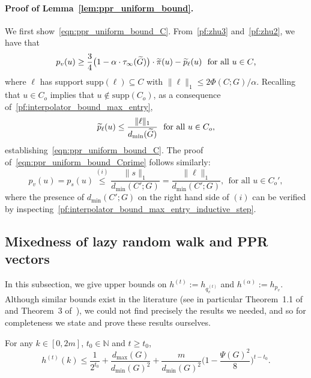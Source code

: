 \paragraph{Proof of Lemma~\ref{lem:ppr_uniform_bound}.}
	We first show~\eqref{eqn:ppr_uniform_bound_C}. From~\eqref{pf:zhu3} and~\eqref{pf:zhu2}, we have that
	\begin{equation*}
	p_v(u) \geq \frac{3}{4}\bigl(1 - \alpha \cdot \tau_{\infty}(\widetilde{G})\bigr) \cdot \widetilde{\pi}(u) - \widetilde{p}_{\ell}(u)~~\textrm{for all $u \in C$,}
	\end{equation*}
	where $\ell$ has support $\mathrm{supp}(\ell) \subseteq C$ with $\|\ell\|_1 \leq 2\Phi(C;G)/\alpha$. Recalling that $u \in C_{o}$ implies that $u \not\in \mathrm{supp}(C_{o})$, as a consequence of~\eqref{pf:interpolator_bound_max_entry}, 
	\begin{equation*}
	\widetilde{p}_{\ell}(u) \leq \frac{\|\ell\|_1}{d_{\min}(\widetilde{G})}~~\textrm{for all $u \in C_{o}$,}
	\end{equation*}
	establishing~\eqref{eqn:ppr_uniform_bound_C}. The proof of~\eqref{eqn:ppr_uniform_bound_Cprime} follows similarly:
	\begin{equation*}
	p_v(u) = p_s(u) \overset{(i)}{\leq} \frac{\|s\|_1}{d_{\min}(C';G)} = \frac{\|\ell\|_1}{d_{\min}(C';G)},~~\textrm{for all $u \in C_{o}'$},
	\end{equation*}
	where the presence of $d_{\min}(C';G)$ on the right hand side of $(i)$ can be verified by inspecting~\eqref{pf:interpolator_bound_max_entry_inductive_step}. 	

\subsection{Mixedness of lazy random walk and PPR vectors}
\label{subsec:lovasz_simonovits_bounds}
In this subsection, we give upper bounds on $h^{(t)} := h_{q_v^{(t)}}$ and $h^{(\alpha)} := h_{p_v}$. Although similar bounds exist in the literature (see in particular Theorem~1.1 of \citep{lovasz1990} and Theorem~3 of~\citep{andersen2006}), we could not find precisely the results we needed, and so for completeness we state and prove these results ourselves. 

\begin{theorem}
	\label{thm:mixing_time_rw}
	For any $k \in [0, 2m]$, $t_0 \in \mathbb{N}$ and $t \geq t_0$,
	\begin{equation}
	\label{eqn:mixing_time_rw_1}
	h^{(t)}(k) \leq \frac{1}{2^{t_0}} + \frac{d_{\max}(G)}{d_{\min}(G)^2} + \frac{m}{d_{\min}(G)^2} \biggl(1 - \frac{\Psi(G)^2}{8}\biggr)^{t - t_0}.
	\end{equation}
\end{theorem}


